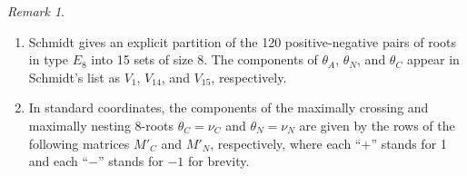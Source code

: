 \documentclass[11pt]{amsart}
\theoremstyle{plain}
\theoremstyle{definition}
\theoremstyle{remark}
\newtheorem{rmk}[theorem]{Remark}
\numberwithin{equation}{subsection}
\begin{document}
\begin{rmk}\label{rmk:schmidtv}
    \begin{enumerate}
        \item [{\rm (i)}]
Schmidt \cite[Lemma 3.4]{schmidt24} gives an explicit partition of the 120
positive-negative pairs of roots in type $E_8$ into 15 sets of size 8. The
components of $\theta_A$, $\theta_N$, and $\theta_C$ appear in Schmidt's list as
$V_1$, $V_{14}$, and $V_{15}$, respectively.
        \item [{\rm (ii)}] In standard coordinates, the components of the
             maximally crossing and maximally nesting $8$-roots $\theta_C=\nu_C$
             and $\theta_N=\nu_N$ are given by the rows of the following
             matrices $M'_C$ and $M'_N$, respectively, where each ``$+$'' stands for
1 and each ``$-$'' stands for $-1$ for brevity. 


\end{enumerate}
\end{rmk}
\end{document}
